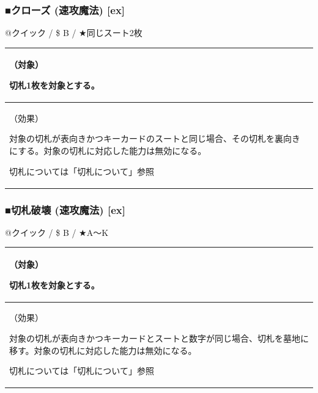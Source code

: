 \documentclass[twocolumn,a5paper,papersize,10pt]{jarticle}
\begin{document}
\vspace{1zh} %
\subsubsection*{■クローズ (速攻魔法) [ex]} %
\vspace{-0.5zh}

@クイック
  / \$ B
  / ★同じスート2枚

\vspace{-1.2zh}%
\begin{spacing}{0.8}%
\begin{center}

\begin{tabularx}{6.5cm}{p{6cm}} \toprule[0.4pt]
（対象）

切札1枚を対象とする。
\\ \midrule[0.4pt]
（効果）

対象の切札が表向きかつキーカードのスートと同じ場合、その切札を裏向きにする。対象の切札に対応した能力は無効になる。 

切札については「切札について」参照
\\ \bottomrule[0.4pt]
\end{tabularx}

\end{center}
\end{spacing}
\vspace{-4zh}


\vspace{1zh} %
\subsubsection*{■切札破壊 (速攻魔法) [ex]} %
\vspace{-0.5zh}

@クイック
  / \$ B
  / ★A〜K

\vspace{-1.2zh}%
\begin{spacing}{0.8}%
\begin{center}

\begin{tabularx}{6.5cm}{p{6cm}} \toprule[0.4pt]
（対象）

切札1枚を対象とする。
\\ \midrule[0.4pt]
（効果）

対象の切札が表向きかつキーカードとスートと数字が同じ場合、切札を墓地に移す。対象の切札に対応した能力は無効になる。 

切札については「切札について」参照
\\ \bottomrule[0.4pt]
\end{tabularx}

\end{center}
\end{spacing}
\vspace{-4zh}
\end{document}
